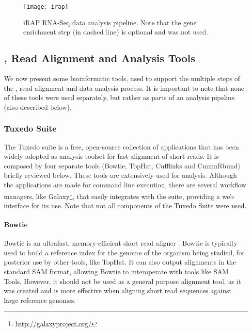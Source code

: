 \begin{figure}[!htb]
  \begin{center}
    \leavevmode
    \texttt{[image: irap]}
    \caption[iRAP RNA-Seq data analysis pipeline]{
      iRAP RNA-Seq data analysis pipeline. Note that the gene enrichment step
      (in dashed line) is optional and was not used.
    }
    \label{fig:irap}
  \end{center}
\end{figure}

\subsection{\rnaseq{}, Read Alignment and Analysis Tools}

We now present some bioinformatic tools, used to support the multiple steps of
the \rnaseq{}, read alignment and data analysis process. It is important to note
that none of these tools were used separately, but rather as parts of an
analysis pipeline (also described below).

\subsubsection*{Tuxedo Suite}

The Tuxedo suite is a free, open-source collection of applications that has been
widely adopted as analysis toolset for fast alignment of short reads. It is
composed by four separate tools (Bowtie, TopHat, Cufflinks and CummRbund)
briefly reviewed below. These tools are extensively used for \rnaseq{} analysis.
Although the applications are made for command line execution, there are several
workflow managers, like Galaxy\footnote{\url{http://galaxyproject.org/}}, that
easily integrates with the suite, providing a web interface for its use. Note
that not all components of the Tuxedo Suite were used.

\paragraph{Bowtie}

Bowtie is an ultrafast, memory-efficient short read aligner
\cite{langmead2009ultrafast}. Bowtie is typically used to build a reference
index for the genome of the organism being studied, for posterior use by other
tools, like TopHat. It can also output alignments in the standard SAM format,
allowing Bowtie to interoperate with tools like SAM Tools. However, it should
not be used as a general purpose alignment tool, as it was created and is more
effective when aligning short read sequences against large reference genomes.

